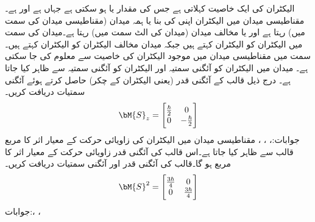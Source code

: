 الیکٹران کی ایک خاصیت   کہلاتی ہے جس کی مقدار   یا  ہو سکتی ہے  جہاں  ہے اور    ہے۔مقناطیسی میدان میں الیکٹران اپنی  کی بنا یا ہمہ میدان (مقناطیسی میدان کی سمت میں) رہتا ہے اور یا مخالف میدان (میدان کی الٹ سمت میں) رہتا ہے۔میدان کی سمت میں الیکٹران کو  الیکٹران کہتے ہیں جبکہ میدان مخالف الیکٹران کو  الیکٹران کہتے ہیں۔ سمت میں مقناطیسی میدان میں موجود الیکٹران کی خاصیت   سے معلوم کی جا سکتی ہے۔ میدان میں  الیکٹران کو آئگنی سمتیہ  اور  الیکٹران کو آئگنی سمتیہ  سے ظاہر کیا جاتا ہے۔ درج ذیل  قالب کے آئگنی قدر (یعنی الیکٹران کے چکر) حاصل کرتے ہوئے آئگنی سمتیات دریافت کریں۔
 \begin{align*}
\bM{S}_z=\begin{bmatrix} \frac{\hbar}{2} & 0\\ 0 & -\frac{\hbar}{2}\end{bmatrix}
\end{align*}
جوابات:، ، ،  
مقناطیسی میدان میں الیکٹران کی زاویائی حرکت کے معیار اثر کا مربع  قالب سے ظاہر کیا جاتا ہے۔اس قالب کی آئگنی قدر زاویائی حرکت کے معیار اثر کا مربع ہو گا۔قالب کی آئگنی قدر اور آئگنی سمتیات دریافت کریں۔
  \begin{align*}
\bM{S}^2=\begin{bmatrix} \frac{3\hbar}{4} & 0\\ 0 & \frac{3\hbar}{4}\end{bmatrix}
\end{align*}
جوابات:،  ، 
